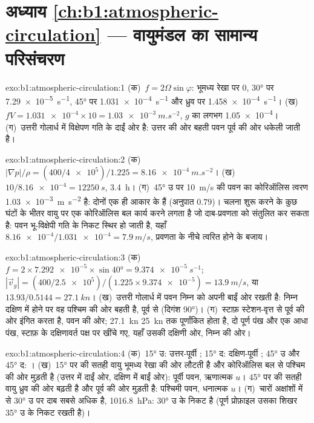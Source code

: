 \section*{अध्याय \ref{ch:b1:atmospheric-circulation} --- वायुमंडल का सामान्य परिसंचरण}

\begin{solution}{exo:b1:atmospheric-circulation:1}
(क)~$f = 2\Omega\sin\varphi$: भूमध्य रेखा पर $0$, \ang{30} पर \qty{7.29e-5}{s^{-1}},
\ang{45} पर \qty{1.031e-4}{s^{-1}} और ध्रुव पर \qty{1.458e-4}{s^{-1}}।
(ख)~$fV = \num{1.031e-4} \times 10 = \qty{1.03e-3}{m.s^{-2}}$, $g$ का लगभग \num{1.05e-4}। (ग)~उत्तरी गोलार्ध में विक्षेपण गति के दाईं ओर है: उत्तर की ओर बहती पवन पूर्व की ओर धकेली जाती है।
\end{solution}

\begin{solution}{exo:b1:atmospheric-circulation:2}
(क)~$|\nabla p|/\rho = (400/\num{4e5})/1.225 = \qty{8.16e-4}{m.s^{-2}}$।
(ख)~$10/\num{8.16e-4} = \qty{12250}{s}$, \qty{3.4}{h}। (ग)~\ang{45} उ पर \qty{10}{m/s} की पवन का कोरिऑलिस त्वरण \qty{1.03e-3}{m.s^{-2}} है: दोनों एक ही आकार के हैं (अनुपात $0.79$)। चलना शुरू करने के कुछ घंटों के भीतर वायु पर एक कोरिऑलिस बल कार्य करने लगता है जो दाब-प्रवणता को संतुलित कर सकता है: पवन भू-विक्षेपी गति के निकट स्थिर हो जाती है, यहाँ $\num{8.16e-4}/\num{1.031e-4} = \qty{7.9}{m/s}$, प्रवणता के नीचे त्वरित होने के बजाय।
\end{solution}

\begin{solution}{exo:b1:atmospheric-circulation:3}
(क)~$f = 2 \times \num{7.292e-5} \times \sin\ang{40} = \qty{9.374e-5}{s^{-1}}$;
$|\vec v_g| = (400/\num{2.5e5})/(1.225 \times \num{9.374e-5}) = \qty{13.9}{m/s}$, या
$13.93/0.5144 = \qty{27.1}{kn}$। (ख)~उत्तरी गोलार्ध में पवन निम्न को अपनी बाईं ओर रखती है: निम्न दक्षिण में होने पर वह पश्चिम की ओर बहती है, पूर्व से (दिगंश \ang{90})। (ग)~स्टाफ़ स्टेशन-वृत्त से पूर्व की ओर इंगित करता है, पवन की ओर; \qty{27.1}{kn} \qty{25}{kn} तक पूर्णांकित होता है, दो पूर्ण पंख और एक आधा पंख, स्टाफ़ के दक्षिणावर्त पक्ष पर खींचे गए, यहाँ उसकी दक्षिणी ओर, निम्न की ओर।
\end{solution}

\begin{solution}{exo:b1:atmospheric-circulation:4}
(क)~\ang{15} उ: उत्तर-पूर्वी ; \ang{15} द: दक्षिण-पूर्वी ; \ang{45} उ और \ang{45} द: । (ख)~\ang{15} पर  की सतही वायु भूमध्य रेखा की ओर लौटती है और कोरिऑलिस बल से पश्चिम की ओर मुड़ती है (उत्तर में दाईं ओर, दक्षिण में बाईं ओर): पूर्वी पवन, ऋणात्मक $u$। \ang{45} पर  की सतही वायु ध्रुव की ओर बढ़ती है और पूर्व की ओर मुड़ती है: पश्चिमी पवन, धनात्मक $u$। (ग)~चारों अक्षांशों में से \ang{30} उ पर दाब सबसे अधिक है, \qty{1016.8}{hPa}:  \ang{30} उ के निकट है (पूर्ण प्रोफ़ाइल उसका शिखर \ang{35} उ के निकट रखती है)।
\end{solution}

